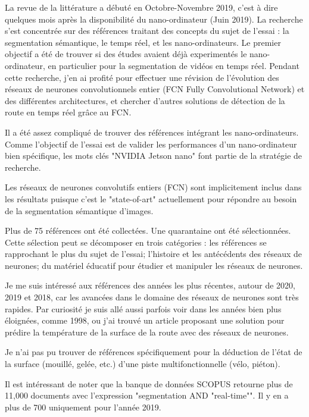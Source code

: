 \par La revue de la littérature  a débuté en Octobre-Novembre 2019, c'est à dire quelques mois après la disponibilité du nano-ordinateur (Juin 2019). La recherche s'est concentrée sur des références traitant des concepts du sujet de l'essai : la segmentation sémantique, le temps réel, et les nano-ordinateurs. Le premier objectif a été de trouver si des études avaient déjà experimentés le nano-ordinateur, en particulier pour la segmentation de vidéos en temps réel. Pendant cette recherche, j'en ai profité pour effectuer une révision de l'évolution des réseaux de neurones convolutionnels entier (FCN Fully Convolutional Network)  et des différentes architectures, et chercher d'autres solutions de détection de la route en temps réel grâce au FCN. 
\par Il a été assez compliqué de trouver des références intégrant les nano-ordinateurs. Comme l'objectif de l'essai est de valider les performances d'un nano-ordinateur bien spécifique, les mots clés "NVIDIA Jetson nano" font partie de la stratégie de recherche. 
\par Les réseaux de neurones convolutifs entiers (FCN) sont implicitement inclus dans les résultats puisque c'est le "state-of-art" actuellement pour répondre au besoin de la segmentation sémantique d'images.
\par Plus de 75 références ont été collectées. Une quarantaine ont été sélectionnées. Cette sélection peut se décomposer en trois catégories : les références se rapprochant le plus du sujet de l'essai; l'histoire et les antécédents des réseaux de neurones; du matériel éducatif pour étudier et manipuler les réseaux de neurones.
\par Je me suis intéressé aux références des années les plus récentes, autour de 2020, 2019 et 2018, car les avancées dans le domaine des réseaux de neurones sont très rapides. Par curiosité je suis allé aussi parfois voir dans les années bien plus éloignées, comme 1998, ou j'ai trouvé un article proposant une solution pour prédire la température de la surface de la route avec des réseaux de neurones.
\par Je n'ai pas pu trouver de références spécifiquement pour la déduction de l'état de la surface (mouillé, gelée, etc.) d'une piste multifonctionnelle (vélo, piéton). 
\par Il est intéressant de noter que la banque de données SCOPUS retourne plus de 11,000 documents avec l'expression "segmentation AND "real-time"". Il y en a plus de 700 uniquement pour l'année 2019. 
\vspace{1\baselineskip}
\par 